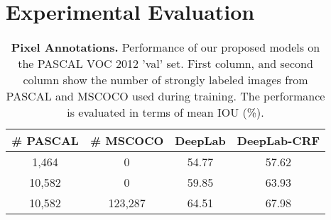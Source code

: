 \section{Experimental Evaluation}

\begin{table}
  \centering
  \caption{{\bf{Pixel Annotations.}} Performance of our proposed models on the PASCAL VOC 2012 'val' set. First column, and second column show the number of strongly labeled images from PASCAL and MSCOCO used during training. The performance is evaluated in terms of mean IOU (\%).}
  \begin{tabular}{| c | c | c | c |}
    \hline
    \# PASCAL & \# MSCOCO & DeepLab & DeepLab-CRF \\
    \hline
    1,464  &   0     & 54.77 & 57.62  \\
    \hline
    10,582 &   0     & 59.85 & 63.93  \\
    \hline
    10,582 & 123,287 & 64.51 & 67.98 \\
    \hline
    \end{tabular}
  \label{tb:pixel_annot}
\end{table}

\begin{table}[t]
  \centering
  \caption{{\bf Pixel+Image Annotations.} }
  \label{tab:strong_weak_annot}
\end{table}


